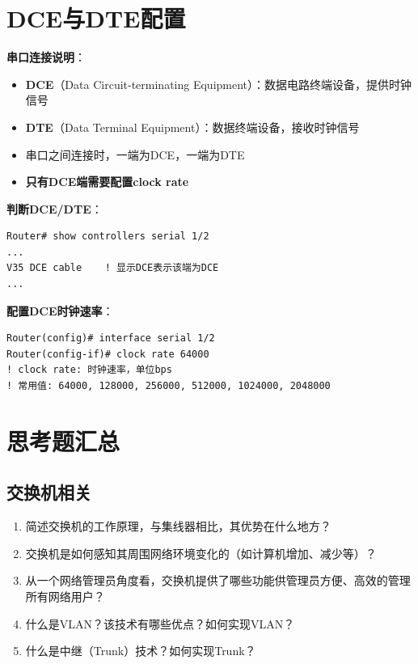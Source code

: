 \documentclass[12pt,a4paper]{ctexart}
\begin{document}
\section{DCE与DTE配置}

\begin{keybox}
\textbf{串口连接说明}：
\begin{itemize}[itemsep=0pt]
    \item \textbf{DCE}（Data Circuit-terminating Equipment）：数据电路终端设备，提供时钟信号
    \item \textbf{DTE}（Data Terminal Equipment）：数据终端设备，接收时钟信号
    \item 串口之间连接时，一端为DCE，一端为DTE
    \item \textbf{只有DCE端需要配置clock rate}
\end{itemize}

\textbf{判断DCE/DTE}：
\begin{lstlisting}
Router# show controllers serial 1/2
...
V35 DCE cable    ! 显示DCE表示该端为DCE
...
\end{lstlisting}

\textbf{配置DCE时钟速率}：
\begin{lstlisting}
Router(config)# interface serial 1/2
Router(config-if)# clock rate 64000
! clock rate: 时钟速率，单位bps
! 常用值: 64000, 128000, 256000, 512000, 1024000, 2048000
\end{lstlisting}
\end{keybox}

\section{思考题汇总}

\subsection{交换机相关}

\begin{enumerate}[leftmargin=2em,itemsep=0pt]
    \item 简述交换机的工作原理，与集线器相比，其优势在什么地方？
    \item 交换机是如何感知其周围网络环境变化的（如计算机增加、减少等）？
    \item 从一个网络管理员角度看，交换机提供了哪些功能供管理员方便、高效的管理所有网络用户？
    \item 什么是VLAN？该技术有哪些优点？如何实现VLAN？
    \item 什么是中继（Trunk）技术？如何实现Trunk？
\end{enumerate}
\end{document}
